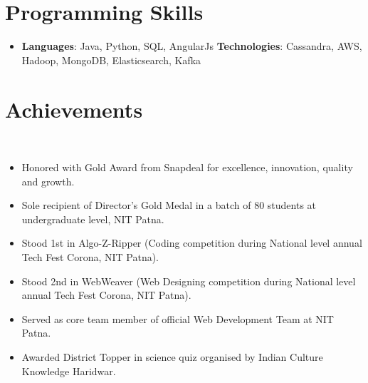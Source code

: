 \documentclass[letterpaper,11pt]{article}
\newcommand{\resumeItems}[2]{
	\item\small{
		\textbf{#1}{ #2 \vspace{-7pt}}
	}
}
\newcommand{\resumeSubHeadingListStart}{\begin{itemize}[leftmargin=*]}
\newcommand{\resumeSubHeadingListEnd}{\end{itemize}}
\newcommand{\resumeItemListStart}{\begin{itemize}}
\newcommand{\resumeItemListEnd}{\end{itemize}\vspace{-5pt}}
\begin{document}
\section{Programming Skills}
  \resumeSubHeadingListStart
    \item{
      \textbf{Languages}{: Java, Python, SQL, AngularJs}
      \hfill
      \textbf{Technologies}{: Cassandra, AWS, Hadoop, MongoDB, Elasticsearch, Kafka}
    }
  \resumeSubHeadingListEnd

\section{Achievements}
\ \resumeItemListStart
	\resumeItems{}{Honored with Gold Award from Snapdeal for excellence, innovation, quality and growth.}
	\resumeItems{}{Sole recipient of Director's Gold Medal in a batch of 80 students at undergraduate level, NIT Patna.}
	\resumeItems{}{Stood 1st in Algo-Z-Ripper (Coding competition during National level annual Tech Fest Corona, NIT Patna).}
	\resumeItems{}{Stood 2nd in WebWeaver (Web Designing competition during National level annual Tech Fest Corona, NIT Patna).}
	\resumeItems{}{Served as core team member of official Web Development Team at NIT Patna.}
	\resumeItems{}{Awarded District Topper in science quiz organised by Indian Culture Knowledge Haridwar.}
\resumeItemListEnd
\end{document}
